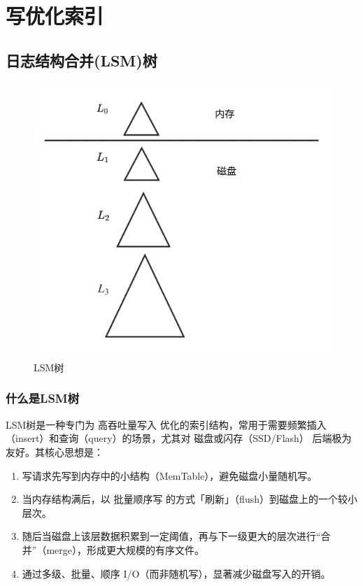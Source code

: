 \section{写优化索引}

\subsection{日志结构合并(LSM)树}

\begin{figure}[H]
    \centering
    \includegraphics[width=0.9\linewidth]{image6.png}
    \caption{LSM树}
    \label{}
\end{figure}

\subsubsection{什么是LSM树}

LSM树是一种专门为 高吞吐量写入 优化的索引结构，常用于需要频繁插入（insert）和查询（query）的场景，尤其对 磁盘或闪存（SSD/Flash） 后端极为友好。其核心思想是：

\begin{enumerate}
    \item 写请求先写到内存中的小结构（MemTable），避免磁盘小量随机写。
    \item 当内存结构满后，以 批量顺序写 的方式「刷新」（flush）到磁盘上的一个较小层次。
    \item 随后当磁盘上该层数据积累到一定阈值，再与下一级更大的层次进行“合并”（merge），形成更大规模的有序文件。
    \item 通过多级、批量、顺序 I/O（而非随机写），显著减少磁盘写入的开销。
\end{enumerate}

